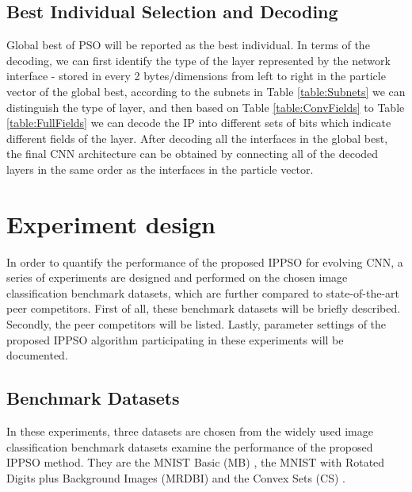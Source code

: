 \documentclass[conference]{IEEEtran}
\begin{document}
\subsection{Best Individual Selection and Decoding}

Global best of PSO will be reported as the best individual. In terms of the decoding, we can first identify the type of the layer represented by the network interface - stored in every 2 bytes/dimensions from left to right in the particle vector of the global best, according to the subnets in Table \ref{table:Subnets} we can distinguish the type of layer, and then based on Table \ref{table:ConvFields} to Table \ref{table:FullFields} we can decode the IP into different sets of bits which indicate different fields of the layer. After decoding all the interfaces in the global best, the final CNN architecture can be obtained by connecting all of the decoded layers in the same order as the interfaces in the particle vector. 

\section{Experiment design}\label{sec:EPDesign}

In order to quantify the performance of the proposed IPPSO for evolving CNN, a series of experiments are designed and performed on the chosen image classification benchmark datasets, which are further compared to state-of-the-art peer competitors. First of all, these benchmark datasets will be briefly described. Secondly, the peer competitors will be listed. Lastly, parameter settings of the proposed IPPSO algorithm participating in these experiments will be documented.

\subsection{Benchmark Datasets}

In these experiments, three datasets are chosen from the widely used image classification benchmark datasets examine the performance of the proposed IPPSO method. They are the MNIST Basic (MB) \cite{DeepArchitectureEval:Larochelle}, the MNIST with Rotated Digits plus Background Images (MRDBI) \cite{DeepArchitectureEval:Larochelle} and the Convex Sets (CS) \cite{DeepArchitectureEval:Larochelle}. 
\end{document}
